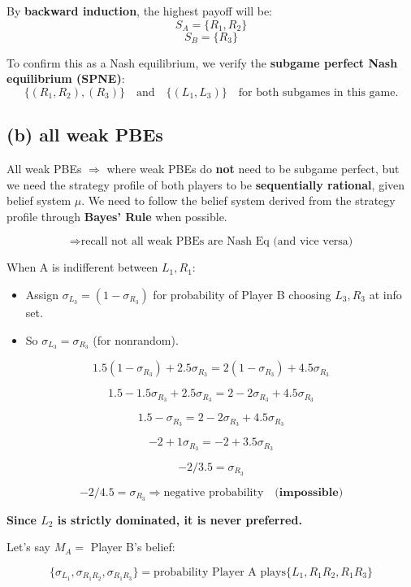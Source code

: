 \documentclass{article}
\begin{document}
By \textbf{backward induction}, the highest payoff will be:
\[
S_A = \{R_1, R_2\}
\]
\[
S_B = \{R_3\}
\]

To confirm this as a Nash equilibrium, we verify the \textbf{subgame perfect Nash equilibrium (SPNE)}:
\[
\{(R_1, R_2), (R_3)\} \quad \text{and} \quad \{(L_1, L_3)\} \quad \text{for both subgames in this game.}
\]

\subsection*{(b) all weak PBEs}

All weak PBEs $\Rightarrow$ where weak PBEs do \textbf{not} need to be subgame perfect, but we need the strategy profile of both players to be \textbf{sequentially rational}, given belief system $\mu$. We need to follow the belief system derived from the strategy profile through \textbf{Bayes' Rule} when possible.

\[
\Rightarrow \text{recall not all weak PBEs are Nash Eq (and vice versa)}
\]

When A is indifferent between $L_1, R_1$:
\begin{itemize}
    \item Assign $\sigma_{L_3} = (1 - \sigma_{R_3})$ for probability of Player B choosing $L_3, R_3$ at info set.
    \item So $\sigma_{L_3} = \sigma_{R_3}$ (for nonrandom).
\end{itemize}

\[
1.5(1 - \sigma_{R_3}) + 2.5\sigma_{R_3} = 2(1 - \sigma_{R_3}) + 4.5\sigma_{R_3}
\]

\[
1.5 - 1.5\sigma_{R_3} + 2.5\sigma_{R_3} = 2 - 2\sigma_{R_3} + 4.5\sigma_{R_3}
\]

\[
1.5 - \sigma_{R_3} = 2 - 2\sigma_{R_3} + 4.5\sigma_{R_3}
\]

\[
-2 + 1\sigma_{R_3} = -2 + 3.5\sigma_{R_3}
\]

\[
-2 / 3.5 = \sigma_{R_3}
\]

\[
-2 / 4.5 = \sigma_{R_3} \Rightarrow \text{negative probability} \quad \textbf{(impossible)}
\]

\textbf{Since $L_2$ is strictly dominated, it is never preferred.}

\vspace{1em}

Let’s say $M_A =$ Player B's belief:

\[
\{\sigma_{L_1}, \sigma_{R_1 R_2}, \sigma_{R_1 R_3}\} = \text{probability Player A plays} \{L_1, R_1 R_2, R_1 R_3\}
\]
\end{document}
